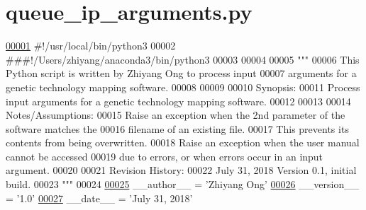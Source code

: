 \hypertarget{queue__ip__arguments_8py_source}{}\section{queue\+\_\+ip\+\_\+arguments.\+py}
\label{queue__ip__arguments_8py_source}

\begin{DoxyCode}
\hypertarget{queue__ip__arguments_8py_source_l00001}{}\hyperlink{namespaceutilities_1_1queue__ip__arguments}{00001} \textcolor{comment}{#!/usr/local/bin/python3}
00002 \textcolor{comment}{###!/Users/zhiyang/anaconda3/bin/python3}
00003 
00004 
00005 \textcolor{stringliteral}{"""}
00006 \textcolor{stringliteral}{    This Python script is written by Zhiyang Ong to process input}
00007 \textcolor{stringliteral}{        arguments for a genetic technology mapping software.}
00008 \textcolor{stringliteral}{}
00009 \textcolor{stringliteral}{}
00010 \textcolor{stringliteral}{    Synopsis:}
00011 \textcolor{stringliteral}{    Process input arguments for a genetic technology mapping software.}
00012 \textcolor{stringliteral}{}
00013 \textcolor{stringliteral}{}
00014 \textcolor{stringliteral}{    Notes/Assumptions:}
00015 \textcolor{stringliteral}{    Raise an exception when the 2nd parameter of the software matches the}
00016 \textcolor{stringliteral}{        filename of an existing file.}
00017 \textcolor{stringliteral}{        This prevents its contents from being overwritten.}
00018 \textcolor{stringliteral}{    Raise an exception when the user manual cannot be accessed}
00019 \textcolor{stringliteral}{        due to errors, or when errors occur in an input argument.}
00020 \textcolor{stringliteral}{}
00021 \textcolor{stringliteral}{    Revision History:}
00022 \textcolor{stringliteral}{    July 31, 2018           Version 0.1, initial build.}
00023 \textcolor{stringliteral}{"""}
00024 
\hypertarget{queue__ip__arguments_8py_source_l00025}{}\hyperlink{namespaceutilities_1_1queue__ip__arguments_adc999d785e9803ef585833d4c1ae53e4}{00025} \_\_author\_\_ = \textcolor{stringliteral}{'Zhiyang Ong'}
\hypertarget{queue__ip__arguments_8py_source_l00026}{}\hyperlink{namespaceutilities_1_1queue__ip__arguments_aac0867ebe34eaed5fb081f33e4ac9740}{00026} \_\_version\_\_ = \textcolor{stringliteral}{'1.0'}
\hypertarget{queue__ip__arguments_8py_source_l00027}{}\hyperlink{namespaceutilities_1_1queue__ip__arguments_a43f24226d75dbc13271de84f469f6944}{00027} \_\_date\_\_ = \textcolor{stringliteral}{'July 31, 2018'}

\end{DoxyCode}
